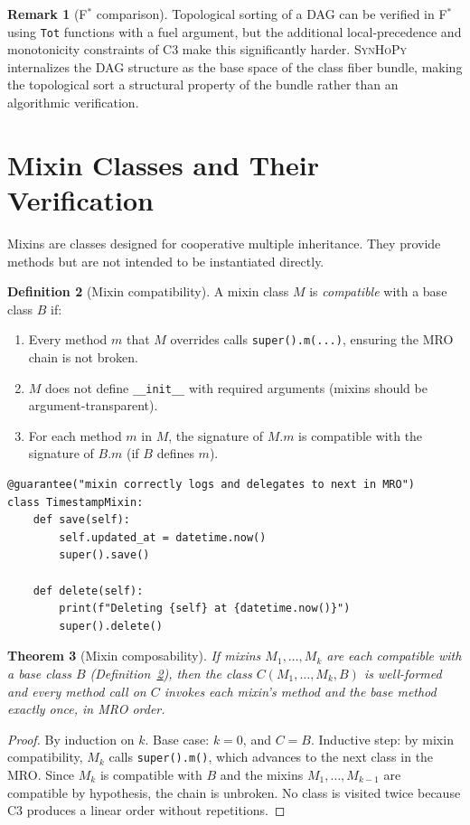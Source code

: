 \documentclass[11pt,a4paper]{report}
\theoremstyle{definition}
\newtheorem{definition}{Definition}[chapter]
\newtheorem{remark}[definition]{Remark}
\theoremstyle{plain}
\newtheorem{theorem}[definition]{Theorem}
\newcommand{\fstar}{F$^{*}$}
\newcommand{\synhopy}{\textsc{SynHoPy}}
\begin{document}
\begin{remark}[\fstar{} comparison]
Topological sorting of a DAG can be verified in \fstar{} using
\lstinline[style=fstar]|Tot| functions with a fuel argument, but the
additional local-precedence and monotonicity constraints of C3 make this
significantly harder.  \synhopy{} internalizes the DAG structure as the
base space of the class fiber bundle, making the topological sort a
structural property of the bundle rather than an algorithmic verification.
\end{remark}

\section{Mixin Classes and Their Verification}

Mixins are classes designed for cooperative multiple inheritance.
They provide methods but are not intended to be instantiated directly.

\begin{definition}[Mixin compatibility]
\label{def:mixin-compat}
A mixin class $M$ is \emph{compatible} with a base class $B$ if:
\begin{enumerate}
  \item Every method $m$ that $M$ overrides calls
    \lstinline[style=python]{super().m(...)},
    ensuring the MRO chain is not broken.
  \item $M$ does not define \lstinline[style=python]{__init__}
    with required arguments (mixins should be argument-transparent).
  \item For each method $m$ in $M$, the signature of $M.m$ is compatible with
    the signature of $B.m$ (if $B$ defines $m$).
\end{enumerate}
\end{definition}

\begin{lstlisting}[style=synhopy]
@guarantee("mixin correctly logs and delegates to next in MRO")
class TimestampMixin:
    def save(self):
        self.updated_at = datetime.now()
        super().save()

    def delete(self):
        print(f"Deleting {self} at {datetime.now()}")
        super().delete()
\end{lstlisting}

\begin{theorem}[Mixin composability]
\label{thm:mixin-compose}
If mixins $M_1, \ldots, M_k$ are each compatible with a base class $B$
(Definition~\ref{def:mixin-compat}), then the class
$C(M_1, \ldots, M_k, B)$ is well-formed and every method call on $C$
invokes each mixin's method and the base method exactly once, in MRO order.
\end{theorem}
\begin{proof}
By induction on $k$.  Base case: $k = 0$, and $C = B$.  Inductive step: by
mixin compatibility, $M_k$ calls \lstinline[style=python]{super().m()}, which
advances to the next class in the MRO.  Since $M_k$ is compatible with $B$
and the mixins $M_1, \ldots, M_{k-1}$ are compatible by hypothesis, the
chain is unbroken.  No class is visited twice because C3 produces a linear
order without repetitions.
\end{proof}
\end{document}

